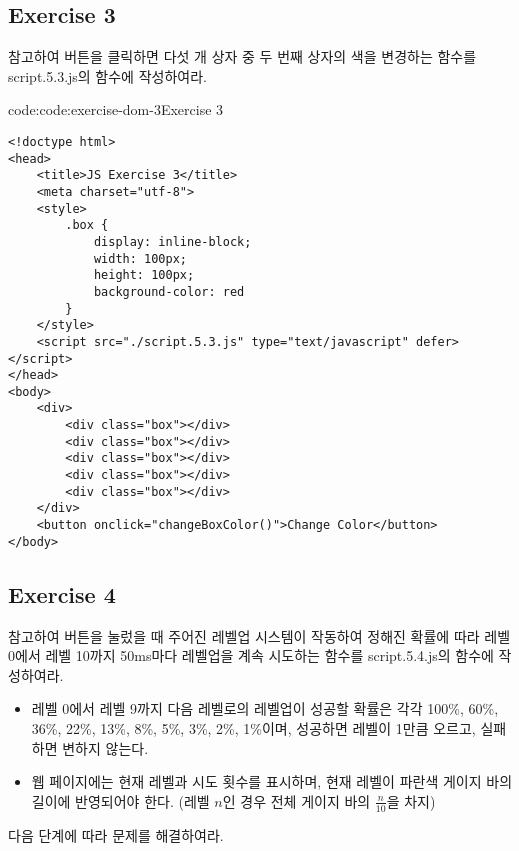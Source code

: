 \subsection*{Exercise 3}

\을 참고하여 버튼을 클릭하면 다섯 개 상자 중 두 번째 상자의 색을 변경하는 함수를 script.5.3.js의  함수에 작성하여라.

\begin{codeenv}{code:code:exercise-dom-3}{Exercise 3}\begin{verbatim}
<!doctype html>
<head>
    <title>JS Exercise 3</title>
    <meta charset="utf-8">
    <style>
        .box {
            display: inline-block;
            width: 100px;
            height: 100px;
            background-color: red
        }
    </style>
    <script src="./script.5.3.js" type="text/javascript" defer></script>
</head>
<body>
    <div>
        <div class="box"></div>
        <div class="box"></div>
        <div class="box"></div>
        <div class="box"></div>
        <div class="box"></div>
    </div>
    <button onclick="changeBoxColor()">Change Color</button>
</body>
\end{verbatim}
\end{codeenv}

\subsection*{Exercise 4}

\을 참고하여 버튼을 눌렀을 때 주어진 레벨업 시스템이 작동하여 정해진 확률에 따라 레벨 0에서 레벨 10까지 50ms마다 레벨업을 계속 시도하는 함수를 script.5.4.js의  함수에 작성하여라.

\begin{itemize}
    \item 레벨 0에서 레벨 9까지 다음 레벨로의 레벨업이 성공할 확률은 각각 100\%, 60\%, 36\%, 22\%, 13\%, 8\%, 5\%, 3\%, 2\%, 1\%이며, 성공하면 레벨이 1만큼 오르고, 실패하면 변하지 않는다.
    \item 웹 페이지에는 현재 레벨과 시도 횟수를 표시하며, 현재 레벨이 파란색 게이지 바의 길이에 반영되어야 한다.  (레벨 $n$인 경우 전체 게이지 바의 $\frac n {10}$을 차지)
\end{itemize}

다음 단계에 따라 문제를 해결하여라.

